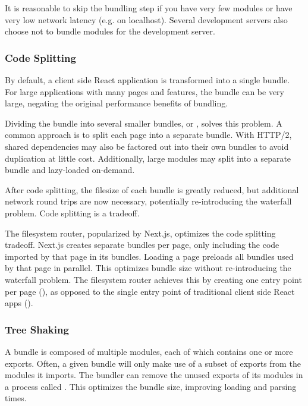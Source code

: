 \documentclass{article}
\begin{document}
It is reasonable to skip the bundling step if you have very few modules or have very low network
latency (e.g. on localhost). Several development servers also choose not to bundle modules for the
development server.

\hypertarget{code-splitting}{
\subsubsection{Code Splitting}
}

By default, a client side React application is transformed into a single bundle. For large
applications with many pages and features, the bundle can be very large, negating the original
performance benefits of bundling.

Dividing the bundle into several smaller bundles, or , solves this problem. A
common approach is to split each page into a separate bundle. With HTTP/2, shared dependencies may
also be factored out into their own bundles to avoid duplication at little cost. Additionally, large
modules may split into a separate bundle and lazy-loaded on-demand.

After code splitting, the filesize of each bundle is greatly reduced, but additional network round
trips are now necessary, potentially re-introducing the waterfall problem. Code splitting is a
tradeoff.

The filesystem router, popularized by Next.js, optimizes the code splitting tradeoff. Next.js
creates separate bundles per page, only including the code imported by that page in its bundles.
Loading a page preloads all bundles used by that page in parallel. This optimizes bundle size
without re-introducing the waterfall problem. The filesystem router achieves this by creating one
entry point per page (), as opposed to the single entry point of traditional
client side React apps ().

\hypertarget{tree-shaking}{
\subsubsection{Tree Shaking}
}

A bundle is composed of multiple modules, each of which contains one or more exports. Often, a given
bundle will only make use of a subset of exports from the modules it imports. The bundler can remove
the unused exports of its modules in a process called . This optimizes the bundle
size, improving loading and parsing times.
\end{document}
